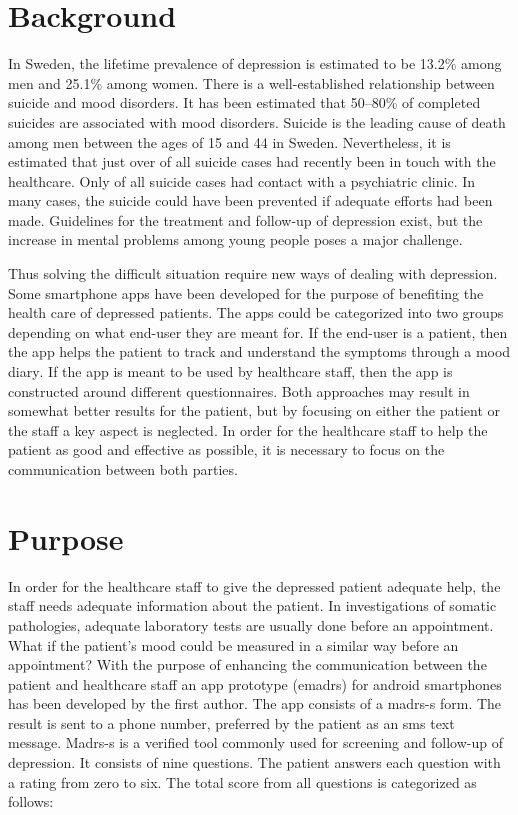 \documentclass[12pt,a4paper,oneside]{article}
\let\oldcite\cite
\renewcommand*\cite[1]{\textsuperscript{\oldcite{#1}}}
\begin{document}
\section*{Background}
In Sweden, the lifetime prevalence of depression is estimated to be 13.2\% among men and 25.1\% among women\cite{numbers0}. There is a well-established relationship between suicide and mood disorders\cite{numbers1.1}. It has been estimated that 50--80\% of completed suicides are associated with mood disorders\cite{numbers1.1}. Suicide is the leading cause of death among men between the ages of 15 and 44 in Sweden\cite{numbers3.0.1}. Nevertheless, it is estimated that just over  of all suicide cases had recently been in touch with the healthcare. Only  of all suicide cases had contact with a psychiatric clinic\cite{numbers2}. In many cases, the suicide could have been prevented if adequate efforts had been made\cite{numbers1}. Guidelines for the treatment and follow-up of depression exist, but the increase in mental problems among young people poses a major challenge\cite{guide1, regionjh1}.

Thus solving the difficult situation require new ways of dealing with depression. Some smartphone apps have been developed for the purpose of benefiting the health care of depressed patients. The apps could be categorized into two groups depending on what end-user they are meant for. If the end-user is a patient, then the app helps the patient to track and understand the symptoms through a mood diary\cite{app1}. If the app is meant to be used by healthcare staff, then the app is constructed around different questionnaires\cite{app2}. Both approaches may result in somewhat better results for the patient, but by focusing on either the patient or the staff a key aspect is neglected. In order for the healthcare staff to help the patient as good and effective as possible, it is necessary to focus on the communication between both parties.

\section*{Purpose}
In order for the healthcare staff to give the depressed patient adequate help, the staff needs adequate information about the patient. In investigations of somatic pathologies, adequate laboratory tests are usually done before an appointment. What if the patient's mood could be measured in a similar way before an appointment? With the purpose of enhancing the communication between the patient and healthcare staff an app prototype (e{\sc madrs}) for android smartphones has been developed by the first author\cite{emadrs1, emadrs2}. The app consists of a {\sc madrs-s} form. The result is sent to a phone number, preferred by the patient as an {\sc sms} text message. {\sc Madrs-s} is a verified tool commonly used for screening and follow-up of depression\cite{madrs2,madrs3}. It consists of nine questions. The patient answers each question with a rating from zero to six. The total score from all questions is categorized as follows:\\
\end{document}

